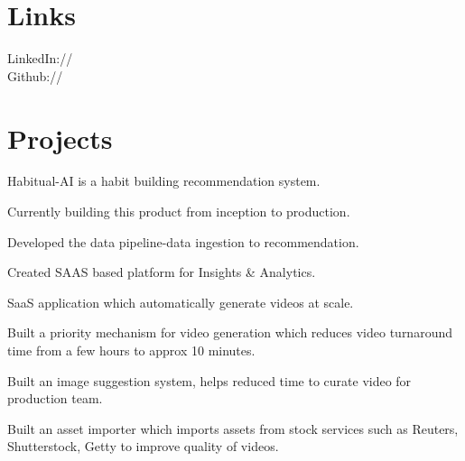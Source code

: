 \documentclass[]{deedy-resume-openfont}
\begin{document}
\begin{minipage}[t]{0.33\textwidth}

\section{Links} 
LinkedIn://  \href{https://www.linkedin.com/in/rohan-pithadiya}{} \\
Github:// \href{https://github.com/Rohanpithadiya}{} \\
\sectionsep

%
%

\end{minipage} 
\hfill
\begin{minipage}[t]{0.65\textwidth} 


\section{Projects}
\location{}
\vspace{\topsep} %
\begin{tightemize}
\item Habitual-AI is a habit building recommendation system.
\item Currently building this product from inception to production.
\item Developed the data pipeline-data ingestion to recommendation.
\item Created SAAS based platform for Insights \& Analytics.
\end{tightemize}
\sectionsep

\location{}
\begin{tightemize}
\item  SaaS application which automatically generate videos at scale.
\item Built a priority mechanism for video generation which reduces video turnaround time from a few hours to approx 10 minutes.
\item Built an image suggestion system, helps reduced time to curate video for production team.
\item Built an asset importer which imports assets from stock services such as Reuters, Shutterstock, Getty to improve quality of videos.
\end{tightemize}
\sectionsep


\end{minipage}
\end{document}
